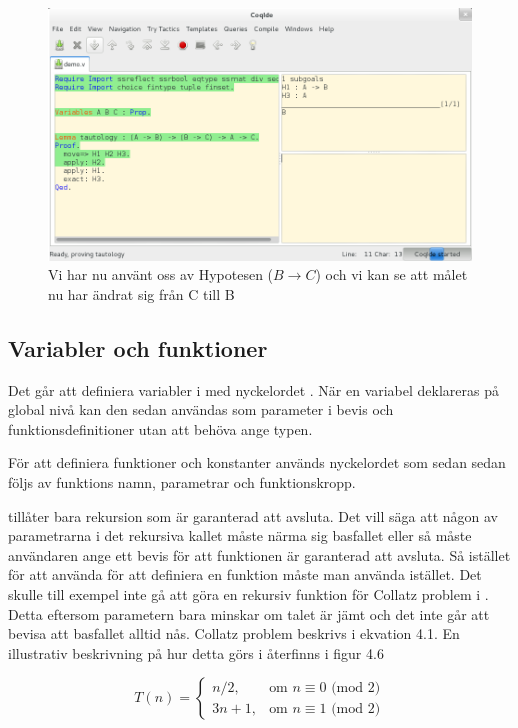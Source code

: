 \begin{figure}[H]
  \centering
  \includegraphics[width=150mm]{images/Proof_part3}
  \caption[Bevis i \coq{} Ide]
   {Vi har nu använt oss av Hypotesen ($B \rightarrow C$) och vi
    kan se att målet nu har ändrat sig från C till B}
\end{figure}


\subsection{Variabler och funktioner}

Det går att definiera variabler i \coq{} med nyckelordet . När en
variabel deklareras på global nivå kan den sedan användas som parameter i bevis
och funktionsdefinitioner utan att behöva ange typen.

För att definiera funktioner och konstanter används nyckelordet
 som sedan sedan följs av funktions namn, parametrar och
funktionskropp.

\coq{} tillåter bara rekursion som är garanterad att avsluta. Det vill säga att
någon av parametrarna i det rekursiva kallet måste närma sig basfallet eller så
måste användaren ange ett bevis för att funktionen är garanterad att avsluta.
Så istället för att använda  för att definiera en funktion måste
man använda  istället. Det skulle till exempel inte gå att göra en
rekursiv funktion för Collatz problem i \coq{}.
Detta eftersom parametern bara
minskar om talet är jämt och det inte går att bevisa att basfallet alltid nås.
Collatz problem beskrivs i ekvation 4.1. En illustrativ beskrivning på hur detta
görs i återfinns i figur 4.6

\begin{equation}
T(n) = \left\{\begin{matrix} n/2, & \mbox{om }n\equiv0\mbox{ (mod 2)} \\ 3n+1,
                         & \mbox{om }n\equiv1\mbox{ (mod 2)} \end{matrix}\right.
\end{equation}





